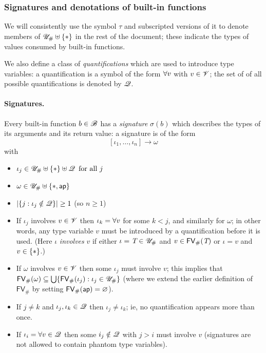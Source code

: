\subsubsection{Signatures and denotations of built-in functions}
\label{sec:signatures}
We will consistently use the symbol $\tau$ and subscripted versions of it to
denote members of $\UnihashStar$ in the rest of the document; these indicate the
types of values consumed by built-in functions.%

\medskip
\noindent We also define a class of \textit{quantifications} which are used to
introduce type variables: a quantification is a symbol of the form
$\mathbf{\forall}v$ with $v \in \mathscr{V}$; the set of of all possible quantifications is
denoted by $\mathscr{Q}$.%
%

\medskip
\paragraph{Signatures.}
Every built-in function $b \in \mathscr{B}$ has a \textit{signature} $\sigma(b)$ which describes
the types of its arguments and its return value: a signature is of the form
$$[\iota_1, \ldots, \iota_n] \rightarrow \omega$$ with
\begin{itemize}
  \item $\iota_j \in \UnihashStar \disj \QVar \enspace\text{for all $j$}$
  \item $\omega \in \UnihashStarAp$
  \item $\lvert\{j : \iota_j \notin \mathscr{Q}\}\rvert \geq 1$ (so $n \geq 1$)
  \item If $\iota_j$ involves $v \in \mathscr{V}$ then $\iota_k = \mathbf{\forall}v$ for
    some $k < j$, and similarly for $\omega$; in other words, any type variable
    $v$ must be introduced by a quantification before it is used. (Here $\iota$
    \textit{involves} $v$ if either $\iota = \textit{T} \in {\mathscr{U}_{\#}}$ and $v \in \mathsf{FV}_{\#}(\textit{T})$
    or $\iota = v$ and $v \in \VarStar$.)
  \item If $\omega$ involves $v \in \mathscr{V}$ then some $\iota_j$ must involve $v$;
    this implies that $\mathsf{FV}_{\#}(\omega) \subseteq \bigcup \{\mathsf{FV}_{\#}(\iota_j): \iota_j \in
    {\mathscr{U}_{\#}}\}$ (where we extend the earlier definition of $\mathsf{FV}_{\#}$ by
    setting $\mathsf{FV}_{\#}(\textsf{ap})=\varnothing$).
  \item If $j \neq k$ and $\iota_j, \iota_k \in \mathscr{Q}$ then $\iota_j \neq
    \iota_k$; ie, no quantification appears more than once.
  \item If $\iota_i = \forall v \in \mathscr{Q}$ then some $i_j \notin \mathscr{Q}$ with $j
    > i$ must involve $v$ (signatures are not allowed to contain phantom type variables).
\end{itemize}%
%
%


